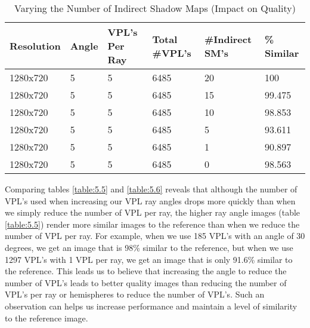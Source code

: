 \begin{table}[h!]
	\caption{Varying the Number of Indirect Shadow Maps (Impact on Quality)}
	\begin{center}
	    \begin{tabular}{ | l | l | l | l | l | l |}
	    \hline
	    Resolution & Angle & VPL's Per Ray & Total \#VPL's & \#Indirect SM's & \% Similar\\ \hline
	    1280x720 & 5 & 5 & 6485 & 20 & 100\\ \hline
	    1280x720 & 5 & 5 & 6485 & 15 & 99.475\\ \hline
	    1280x720 & 5 & 5 & 6485 & 10 & 98.853\\ \hline
	    1280x720 & 5 & 5 & 6485 & 5 & 93.611\\ \hline
	    1280x720 & 5 & 5 & 6485 & 1 & 90.897\\ \hline
	    1280x720 & 5 & 5 & 6485 & 0 & 98.563\\ \hline
	    \end{tabular}
	\end{center}
	\label{table:5.8}
\end{table}

Comparing tables \ref{table:5.5} and \ref{table:5.6} reveals that although the number of VPL's used when increasing our VPL ray angles drops more quickly than when we simply reduce the number of VPL per ray, the higher ray angle images (table \ref{table:5.5}) render more similar images to the reference than when we reduce the number of VPL per ray.  For example, when we use 185 VPL's with an angle of 30 degrees, we get an image that is 98\% similar to the reference, but when we use 1297 VPL's with 1 VPL per ray, we get an image that is only 91.6\% similar to the reference.  This leads us to believe that increasing the angle to reduce the number of VPL's leads to better quality images than reducing the number of VPL's per ray or hemispheres to reduce the number of VPL's.  Such an observation can helps us increase performance and maintain a level of similarity to the reference image.

